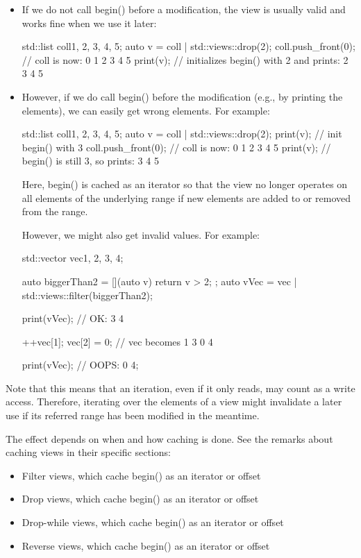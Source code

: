 \begin{itemize}
\item
If we do not call begin() before a modification, the view is usually valid and works fine when we use it later:

\begin{cpp}
std::list coll{1, 2, 3, 4, 5};
auto v = coll | std::views::drop(2);
coll.push_front(0); // coll is now: 0 1 2 3 4 5
print(v); // initializes begin() with 2 and prints: 2 3 4 5
\end{cpp}

\item
However, if we do call begin() before the modification (e.g., by printing the elements), we can easily get wrong elements. For example:

\begin{cpp}
std::list coll{1, 2, 3, 4, 5};
auto v = coll | std::views::drop(2);
print(v); // init begin() with 3
coll.push_front(0); // coll is now: 0 1 2 3 4 5
print(v); // begin() is still 3, so prints: 3 4 5
\end{cpp}

Here, begin() is cached as an iterator so that the view no longer operates on all elements of the underlying range if new elements are added to or removed from the range.

However, we might also get invalid values. For example:

\begin{cpp}
std::vector vec{1, 2, 3, 4};

auto biggerThan2 = [](auto v){ return v > 2; };
auto vVec = vec | std::views::filter(biggerThan2);

print(vVec); // OK: 3 4

++vec[1];
vec[2] = 0; // vec becomes 1 3 0 4

print(vVec); // OOPS: 0 4;
\end{cpp}

\end{itemize}

Note that this means that an iteration, even if it only reads, may count as a write access. Therefore, iterating over the elements of a view might invalidate a later use if its referred range has been modified in the meantime.

The effect depends on when and how caching is done. See the remarks about caching views in their specific sections:

\begin{itemize}
\item
Filter views, which cache begin() as an iterator or offset

\item
Drop views, which cache begin() as an iterator or offset

\item
Drop-while views, which cache begin() as an iterator or offset

\item
Reverse views, which cache begin() as an iterator or offset
\end{itemize}

